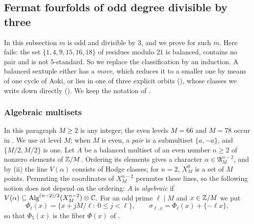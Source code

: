 \subsection{Fermat fourfolds of odd degree divisible by three}\label{ssec:fermatodd}

In this subsection $m$ is odd and divisible by $3$, and we prove
 for such $m$. Here  fails: the set
$\{1,4,9,15,16,18\}$ of residues modulo $21$ is balanced, contains no pair
and is not $5$-standard. So we replace the classification by an induction.
A balanced sextuple either has a \emph{move}, which reduces it to a smaller
one by means of one cycle of Aoki, or lies in one of three explicit orbits
(), whose classes we write down directly
(). We keep the notation of .

\subsubsection*{Algebraic multisets}
In this paragraph $M\ge2$ is any integer; the even levels $M=66$ and $M=78$
occur in . We use  at level $M$;
when $M$ is even, a \emph{pair} is a submultiset $\{a,-a\}$, and
$\{M/2,M/2\}$ is one. Let $A$ be a balanced multiset of an even number
$n\ge2$ of nonzero elements of $\mathbb{Z}/M$. Ordering its elements gives a
character $\alpha\in\mathfrak{A}^{n-2}_{M}$, and by
(ii) the line $V(\alpha)$ consists of Hodge classes;
for $n=2$, $X^{0}_{M}$ is a set of $M$ points. Permuting the coordinates of
$X^{n-2}_{M}$ permutes these lines, so the following notion does not depend
on the ordering: $A$ is \emph{algebraic} if $V(\alpha)\subseteq
\operatorname{Alg}^{(n-2)/2}(X^{n-2}_{M})\otimes\mathbb{C}$. For an odd prime $\ell\mid M$ and
$x\in\mathbb{Z}/M$ we put
\[
  \Phi_{\ell}(x)=\{x+jM/\ell:\ 0\le j<\ell\},\qquad
  \sigma_{\ell,x}=\Phi_{\ell}(x)+\{-\ell x\},
\]
so that $\Phi_{5}(x)$ is the fiber $\Phi(x)$ of .

